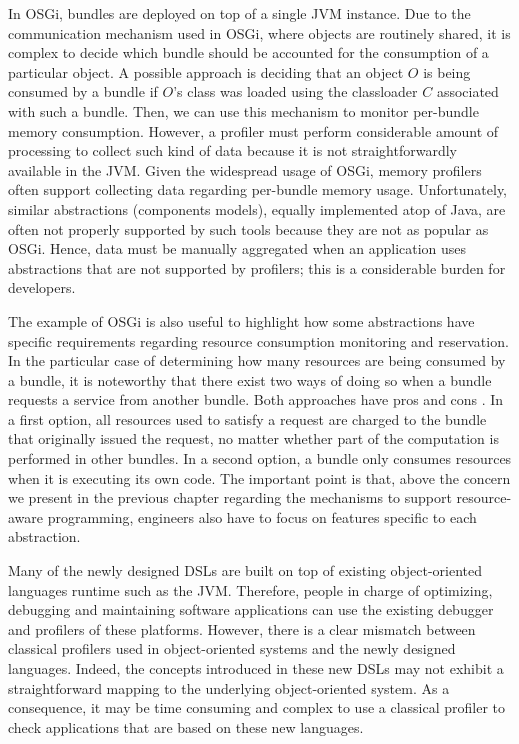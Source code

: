 In OSGi, bundles are deployed on top of a single JVM instance.
Due to the communication mechanism used in OSGi, where objects are routinely shared, it is complex to decide which bundle should be accounted for the consumption of a particular object.
A possible approach is deciding that an object $O$ is being consumed by a bundle if $O$'s class was loaded using the classloader $C$ associated with such a bundle.
Then, we can use this mechanism to monitor per-bundle memory consumption. 
However, a profiler must perform considerable amount of processing to collect such kind of data because it is not straightforwardly available in the JVM. 
Given the widespread usage of OSGi, memory profilers often support collecting data regarding per-bundle memory usage.
Unfortunately, similar abstractions (components models), equally implemented atop of Java, are often not properly supported by such tools because they are not as popular as OSGi.
Hence, data must be manually aggregated when an application uses abstractions that are not supported by profilers; this is a considerable burden for developers.

The example of OSGi is also useful to highlight how some abstractions have specific requirements regarding resource consumption monitoring and reservation.
In the particular case of determining how many resources are being consumed by a bundle, it is noteworthy that there exist two ways of doing so when a bundle requests a service from another bundle.
Both approaches have pros and cons \cite{Miettinen2008,Maurel:2012:AME:2304736.2304763}.
In a first option, all resources used to satisfy a request are charged to the bundle that originally issued the request, no matter whether part of the computation is performed in other bundles.
In a second option, a bundle only consumes resources when it is executing its own code.
The important point is that, above the concern we present in the previous chapter regarding the mechanisms to support resource-aware programming, engineers also have to focus on features specific to each abstraction.

Many of the newly designed DSLs are built on top of existing object-oriented languages runtime such as the JVM. 
Therefore, people in charge of optimizing, debugging and maintaining software applications can use the existing debugger and profilers of these platforms. 
However, there is a clear mismatch between classical profilers used in object-oriented systems and the newly designed languages. 
Indeed, the concepts introduced in these new DSLs may not exhibit a straightforward mapping to the underlying object-oriented system.
As a consequence, it may be time consuming and complex to use a classical profiler to check applications that are based on these new languages.

